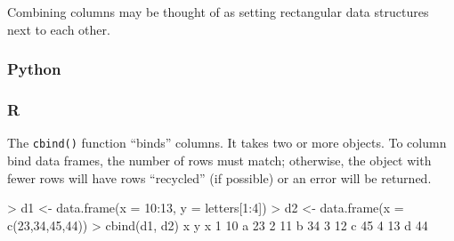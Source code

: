 \documentclass[
]{book}
\newenvironment{Shaded}{\begin{snugshade}}{\end{snugshade}}
\newcommand{\AttributeTok}[1]{\textcolor[rgb]{0.77,0.63,0.00}{#1}}
\newcommand{\DecValTok}[1]{\textcolor[rgb]{0.00,0.00,0.81}{#1}}
\newcommand{\FunctionTok}[1]{\textcolor[rgb]{0.00,0.00,0.00}{#1}}
\newcommand{\NormalTok}[1]{#1}
\newcommand{\OtherTok}[1]{\textcolor[rgb]{0.56,0.35,0.01}{#1}}
\newcommand{\SpecialCharTok}[1]{\textcolor[rgb]{0.00,0.00,0.00}{#1}}
\begin{document}
Combining columns may be thought of as setting rectangular data structures next to each other.

\hypertarget{python-24}{%
\subsubsection*{Python}\label{python-24}}

\hypertarget{r-24}{%
\subsubsection*{R}\label{r-24}}

The \texttt{cbind()} function ``binds'' columns. It takes two or more objects. To column bind data frames, the number of rows must match; otherwise, the object with fewer rows will have rows ``recycled'' (if possible) or an error will be returned.

\begin{Shaded}
\begin{Highlighting}[]
\SpecialCharTok{\textgreater{}}\NormalTok{ d1 }\OtherTok{\textless{}{-}} \FunctionTok{data.frame}\NormalTok{(}\AttributeTok{x =} \DecValTok{10}\SpecialCharTok{:}\DecValTok{13}\NormalTok{, }\AttributeTok{y =}\NormalTok{ letters[}\DecValTok{1}\SpecialCharTok{:}\DecValTok{4}\NormalTok{])}
\SpecialCharTok{\textgreater{}}\NormalTok{ d2 }\OtherTok{\textless{}{-}} \FunctionTok{data.frame}\NormalTok{(}\AttributeTok{x =} \FunctionTok{c}\NormalTok{(}\DecValTok{23}\NormalTok{,}\DecValTok{34}\NormalTok{,}\DecValTok{45}\NormalTok{,}\DecValTok{44}\NormalTok{))}
\SpecialCharTok{\textgreater{}} \FunctionTok{cbind}\NormalTok{(d1, d2)}
\NormalTok{   x y  x}
\DecValTok{1} \DecValTok{10}\NormalTok{ a }\DecValTok{23}
\DecValTok{2} \DecValTok{11}\NormalTok{ b }\DecValTok{34}
\DecValTok{3} \DecValTok{12}\NormalTok{ c }\DecValTok{45}
\DecValTok{4} \DecValTok{13}\NormalTok{ d }\DecValTok{44}
\end{Highlighting}
\end{Shaded}
\end{document}
